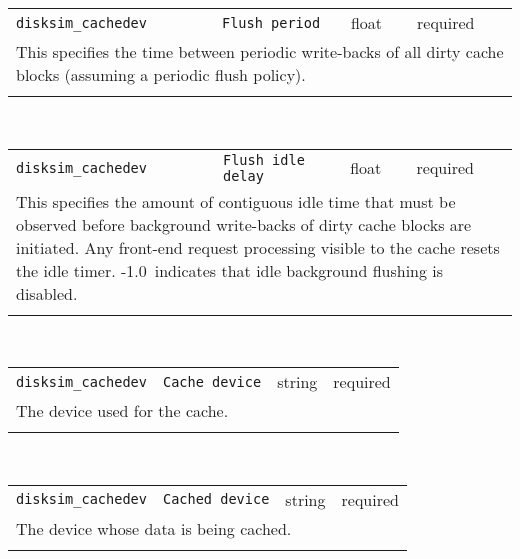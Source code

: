 \noindent 
\begin{tabular}{|p{1.5in}|p{3.5in}|p{0.5in}|p{0.5in}|}
\cline{1-4}
\texttt{disksim\_cachedev} & \texttt{Flush period} & float & required \\ 
\cline{1-4}
\multicolumn{4}{|p{6in}|}{
This specifies the time between periodic write-backs of all dirty cache
blocks (assuming a periodic flush policy).
}\\ 
\cline{1-4}
\multicolumn{4}{p{5in}}{}\\
\end{tabular}\\ 
\noindent 
\begin{tabular}{|p{1.5in}|p{3.5in}|p{0.5in}|p{0.5in}|}
\cline{1-4}
\texttt{disksim\_cachedev} & \texttt{Flush idle delay} & float & required \\ 
\cline{1-4}
\multicolumn{4}{|p{6in}|}{
This specifies the amount of contiguous idle time that must be observed
before background write-backs of dirty cache blocks are initiated.
Any front-end request processing visible to the cache resets the idle
timer. -1.0~indicates that idle background flushing is disabled.
}\\ 
\cline{1-4}
\multicolumn{4}{p{5in}}{}\\
\end{tabular}\\ 
\noindent 
\begin{tabular}{|p{1.5in}|p{3.5in}|p{0.5in}|p{0.5in}|}
\cline{1-4}
\texttt{disksim\_cachedev} & \texttt{Cache device} & string & required \\ 
\cline{1-4}
\multicolumn{4}{|p{6in}|}{
The device used for the cache.
}\\ 
\cline{1-4}
\multicolumn{4}{p{5in}}{}\\
\end{tabular}\\ 
\noindent 
\begin{tabular}{|p{1.5in}|p{3.5in}|p{0.5in}|p{0.5in}|}
\cline{1-4}
\texttt{disksim\_cachedev} & \texttt{Cached device} & string & required \\ 
\cline{1-4}
\multicolumn{4}{|p{6in}|}{
The device whose data is being cached.
}\\ 
\cline{1-4}
\multicolumn{4}{p{5in}}{}\\
\end{tabular}\\ 

